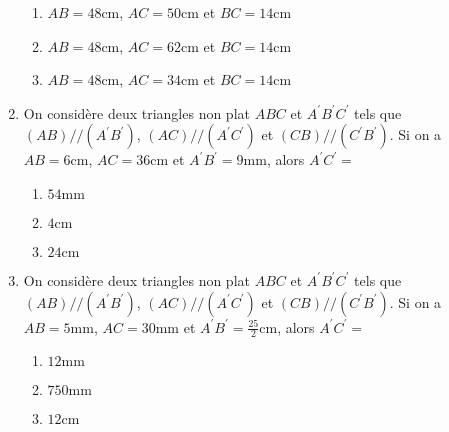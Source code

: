 \documentclass[oneside,twoside]{book}
\begin{document}
\begin{enumerate}
\begin{enumerate}
\item\BonneReponse $AB=48\mathrm{cm}$, $AC=50\mathrm{cm}$ et $BC=14\mathrm{cm}$

\item\MauvaiseReponse $AB=48\mathrm{cm}$, $AC=62\mathrm{cm}$ et $BC=14\mathrm{cm}$

\item\MauvaiseReponse $AB=48\mathrm{cm}$, $AC=34\mathrm{cm}$ et $BC=14\mathrm{cm}$

\end{enumerate}



\item On considère deux triangles non plat $ABC$ et $A^\prime B^\prime C^\prime$ tels que $\left(AB\right)//\left(A^{\prime}B^{\prime}\right)$, $\left(AC\right)//\left(A^{\prime}C^{\prime}\right)$ et $\left(CB\right)//\left(C^{\prime}B^{\prime}\right)$. Si on a $AB=6\mathrm{cm}$, $AC=36\mathrm{cm}$ et $A^{\prime}B^{\prime}=9\mathrm{mm}$, alors $A^{\prime}C^{\prime}=$

\begin{enumerate}

\item\BonneReponse $54\mathrm{mm}$

\item\MauvaiseReponse $4\mathrm{cm}$

\item\MauvaiseReponse $24\mathrm{cm}$

\end{enumerate}



\item On considère deux triangles non plat $ABC$ et $A^\prime B^\prime C^\prime$ tels que $\left(AB\right)//\left(A^{\prime}B^{\prime}\right)$, $\left(AC\right)//\left(A^{\prime}C^{\prime}\right)$ et $\left(CB\right)//\left(C^{\prime}B^{\prime}\right)$. Si on a $AB=5\mathrm{mm}$, $AC=30\mathrm{mm}$ et $A^{\prime}B^{\prime}=\frac{25}{2}\mathrm{cm}$, alors $A^{\prime}C^{\prime}=$

\begin{enumerate}


\item\MauvaiseReponse $12\mathrm{mm}$

\item\BonneReponse $750\mathrm{mm}$

\item\MauvaiseReponse $12\mathrm{cm}$

\end{enumerate}






\end{enumerate}
\end{document}
